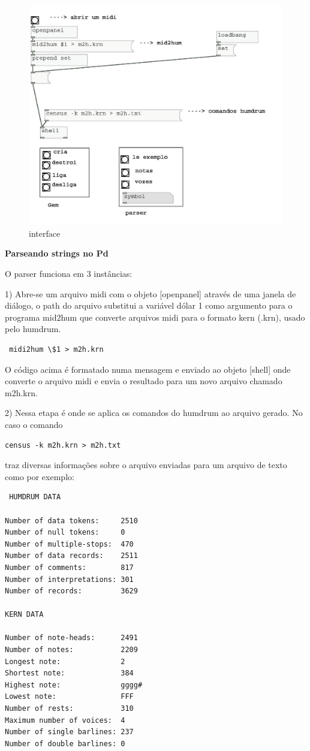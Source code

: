 \documentclass{ppgmus}
\begin{document}
\begin{figure}[-h]
\includegraphics[scale=.7]{interface00}
\caption{interface}
\label{interface}
\end{figure} 

\textbf{Parseando strings no Pd}


O parser funciona em 3 instâncias:

1) Abre-se um arquivo midi com o objeto [openpanel] através
de uma janela de diálogo, o path do arquivo substitui a variável 
dólar 1 como argumento para o programa mid2hum que converte
arquivos midi para o formato kern (.krn), usado pelo humdrum.
\begin{verbatim}
 midi2hum \$1 > m2h.krn
\end{verbatim} 
  O código acima é formatado numa mensagem e enviado ao objeto
[shell] onde converte o arquivo midi e envia o resultado para
um novo arquivo chamado m2h.krn.
 
2) Nessa etapa é onde se aplica os comandos do humdrum ao 
arquivo gerado. No caso o comando
\begin{verbatim}
census -k m2h.krn > m2h.txt
\end{verbatim} 
traz diversas informações sobre o arquivo enviadas para um 
arquivo de texto como por exemplo:
\begin{verbatim}
 HUMDRUM DATA

Number of data tokens:     2510
Number of null tokens:     0
Number of multiple-stops:  470
Number of data records:    2511
Number of comments:        817
Number of interpretations: 301
Number of records:         3629

KERN DATA

Number of note-heads:      2491
Number of notes:           2209
Longest note:              2
Shortest note:             384
Highest note:              gggg#
Lowest note:               FFF
Number of rests:           310
Maximum number of voices:  4
Number of single barlines: 237
Number of double barlines: 0
\end{verbatim} 
\end{document}
